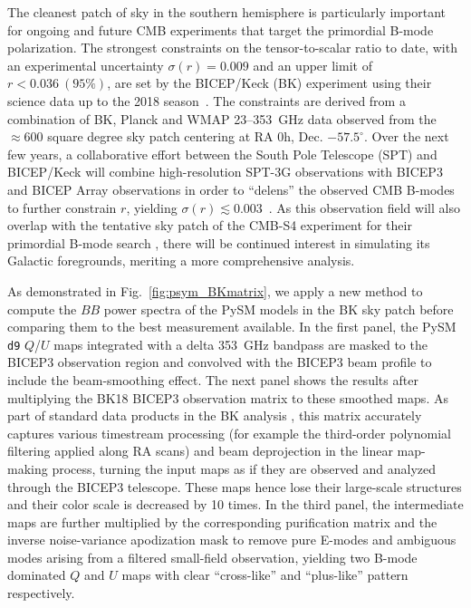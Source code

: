 \documentclass[twocolumn]{aastex631}
\begin{document}
The cleanest patch of sky in the southern hemisphere is particularly important for ongoing and future CMB experiments that target the primordial B-mode polarization. The strongest constraints on the tensor-to-scalar ratio to date, with an experimental uncertainty $\sigma(r) = 0.009$ and an upper limit of $r < 0.036~(95\%)$, are set by the BICEP/Keck (BK) experiment using their science data up to the 2018 season~\citep[``BK18'';][]{Ade:2021}. The constraints are derived from a combination of BK, Planck and WMAP 23--353~GHz data observed from the $\approx 600$ square degree sky patch centering at RA 0h, Dec. $-57.5^{\circ}$. Over the next few years, a collaborative effort between the South Pole Telescope (SPT) and BICEP/Keck will combine high-resolution SPT-3G observations with BICEP3 and BICEP Array observations in order to ``delens'' the observed CMB B-modes to further constrain $r$, yielding $\sigma(r) \lesssim 0.003$~\citep{BICEP/KeckCollaboration:2022}. As this observation field will also overlap with the tentative sky patch of the CMB-S4 experiment for their primordial B-mode search \citep{Abazajian:2022}, there will be continued interest in simulating its Galactic foregrounds, meriting a more comprehensive analysis. 

As demonstrated in Fig.~\ref{fig:psym_BKmatrix}, we apply a new method to compute the $BB$ power spectra of the PySM models in the BK sky patch before comparing them to the best measurement available. In the first panel, the PySM \texttt{d9} $Q$/$U$ maps integrated with a delta 353~GHz bandpass are masked to the BICEP3 observation region and convolved with the BICEP3 beam profile to include the beam-smoothing effect. The next panel shows the results after multiplying the BK18 BICEP3 observation matrix to these smoothed maps. As part of standard data products in the BK analysis \citep{BICEP2Collaboration:2016}, this matrix accurately captures various timestream processing (for example the third-order polynomial filtering applied along RA scans) and beam deprojection in the linear map-making process, turning the input maps as if they are observed and analyzed through the BICEP3 telescope. These maps hence lose their large-scale structures and their color scale is decreased by 10 times. In the third panel, the intermediate maps are further multiplied by the corresponding purification matrix and the inverse noise-variance apodization mask to remove pure E-modes and ambiguous modes arising from a filtered small-field observation, yielding two B-mode dominated $Q$ and $U$ maps with clear ``cross-like'' and ``plus-like'' pattern respectively. 
\end{document}
